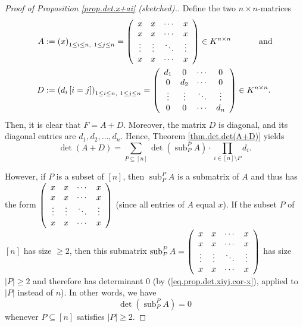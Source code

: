 \begin{proof}
[Proof of Proposition \ref{prop.det.x+ai} (sketched).]Define the two $n\times
n$-matrices%
\begin{align*}
A  &  :=\left(  x\right)  _{1\leq i\leq n,\ 1\leq j\leq n}=\left(
\begin{array}
[c]{cccc}%
x & x & \cdots & x\\
x & x & \cdots & x\\
\vdots & \vdots & \ddots & \vdots\\
x & x & \cdots & x
\end{array}
\right)  \in K^{n\times n}\ \ \ \ \ \ \ \ \ \ \text{and}\\
D  &  :=\left(  d_{i}\left[  i=j\right]  \right)  _{1\leq i\leq n,\ 1\leq
j\leq n}=\left(
\begin{array}
[c]{cccc}%
d_{1} & 0 & \cdots & 0\\
0 & d_{2} & \cdots & 0\\
\vdots & \vdots & \ddots & \vdots\\
0 & 0 & \cdots & d_{n}%
\end{array}
\right)  \in K^{n\times n}.
\end{align*}
Then, it is clear that $F=A+D$. Moreover, the matrix $D$ is diagonal, and its
diagonal entries are $d_{1},d_{2},\ldots,d_{n}$. Hence, Theorem
\ref{thm.det.det(A+D)} yields%
\begin{equation}
\det\left(  A+D\right)  =\sum_{P\subseteq\left[  n\right]  }\det\left(
\operatorname*{sub}\nolimits_{P}^{P}A\right)  \cdot\prod_{i\in\left[
n\right]  \setminus P}d_{i}. \label{pf.prop.det.x+ai.1}%
\end{equation}


However, if $P$ is a subset of $\left[  n\right]  $, then $\operatorname*{sub}%
\nolimits_{P}^{P}A$ is a submatrix of $A$ and thus has the form $\left(
\begin{array}
[c]{cccc}%
x & x & \cdots & x\\
x & x & \cdots & x\\
\vdots & \vdots & \ddots & \vdots\\
x & x & \cdots & x
\end{array}
\right)  $ (since all entries of $A$ equal $x$). If the subset $P$ of $\left[
n\right]  $ has size $\geq2$, then this submatrix $\operatorname*{sub}%
\nolimits_{P}^{P}A=\left(
\begin{array}
[c]{cccc}%
x & x & \cdots & x\\
x & x & \cdots & x\\
\vdots & \vdots & \ddots & \vdots\\
x & x & \cdots & x
\end{array}
\right)  $ has size $\left\vert P\right\vert \geq2$ and therefore has
determinant $0$ (by (\ref{eq.prop.det.xiyj.cor-x}), applied to $\left\vert
P\right\vert $ instead of $n$). In other words, we have%
\begin{equation}
\det\left(  \operatorname*{sub}\nolimits_{P}^{P}A\right)  =0
\label{pf.prop.det.x+ai.2}%
\end{equation}
whenever $P\subseteq\left[  n\right]  $ satisfies $\left\vert P\right\vert
\geq2$.


\end{proof}
